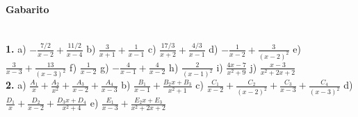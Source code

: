 \documentclass[a4paper,12pt]{article}
\begin{document}
\vspace*{\fill}
{\footnotesize
\paragraph*{Gabarito} \hspace*{\fill}\\
\textbf{1.}
a) $- \frac{7/2}{ x - 2} + \frac{11/2}{x - 4}$
b) $\frac{3}{x + 1} + \frac{1}{x - 1}$
c) $\frac{17/3}{x + 2} + \frac{4/3}{x - 1}$
d) $- \frac{1}{x - 2} + \frac{3}{\left(x - 2\right)^{2}}$
e) $\frac{3}{x - 3} + \frac{13}{\left(x - 3\right)^{2}}$
f) $\frac{1}{x - 2}$
g) $- \frac{4}{x - 1} + \frac{4}{x - 2}$
h) $\frac{2}{\left(x - 1\right)^{2}}$
i) $\frac{4 x - 7}{x^{2} + 9}$
j) $\frac{x - 3}{x^2+2x+2}$\\[2ex]
\textbf{2.}
a) $ \frac{A_1}{x} + \frac{A_2}{x^2} + \frac{A_3}{x-2} + \frac{A_4}{x-3}$
b) $ \frac{B_1}{x-1} + \frac{B_2x+B_3}{x^2+1}$
c) $  \frac{C_1}{x-2} + \frac{C_2}{(x-2)^2} + \frac{C_3}{x-3} + \frac{C_4}{(x-3)^2}$
d) $ \frac{D_1}{x} + \frac{D_2}{x-2} + \frac{D_3x+D_4}{x^2+4}$
e) $ \frac{E_1}{x-3} + \frac{E_2x+E_3}{x^2+2x+2}$
 }
\end{document}
